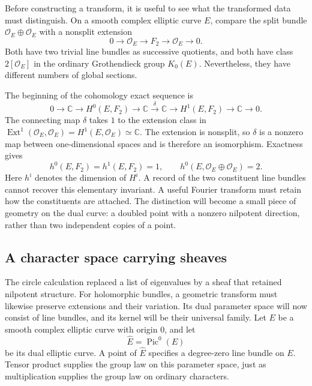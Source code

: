 \documentclass[11pt]{article}
\theoremstyle{remark}
\newcommand{\C}{\mathbb C}
\begin{document}
Before constructing a transform, it is useful to see what the transformed data must distinguish. On a smooth complex elliptic curve \(E\), compare the split bundle \(\mathcal O_E\oplus\mathcal O_E\) with a nonsplit extension
\begin{equation}
0\longrightarrow\mathcal O_E\longrightarrow F_2
\longrightarrow\mathcal O_E\longrightarrow0.
\label{categorical:f2}
\end{equation}
Both have two trivial line bundles as successive quotients, and both have class \(2[\mathcal O_E]\) in the ordinary Grothendieck group \(K_0(E)\). Nevertheless, they have different numbers of global sections.

The beginning of the cohomology exact sequence is
\[
0\longrightarrow\C\longrightarrow H^0(E,F_2)
\longrightarrow\C\xrightarrow{\ \delta\ }\C
\longrightarrow H^1(E,F_2)\longrightarrow\C\longrightarrow0.
\]
The connecting map \(\delta\) takes \(1\) to the extension class in
\(\operatorname{Ext}^1(\mathcal O_E,\mathcal O_E)=H^1(E,\mathcal O_E)\simeq\C\).
The extension is nonsplit, so \(\delta\) is a nonzero map between one-dimensional spaces and is therefore an isomorphism. Exactness gives
\begin{equation}
h^0(E,F_2)=h^1(E,F_2)=1,
\qquad
h^0(E,\mathcal O_E\oplus\mathcal O_E)=2.
\label{categorical:extension-sections}
\end{equation}
Here \(h^i\) denotes the dimension of \(H^i\). A record of the two constituent line bundles cannot recover this elementary invariant. A useful Fourier transform must retain how the constituents are attached. The distinction will become a small piece of geometry on the dual curve: a doubled point with a nonzero nilpotent direction, rather than two independent copies of a point.

\subsection{A character space carrying sheaves}

The circle calculation replaced a list of eigenvalues by a sheaf that retained nilpotent structure. For holomorphic bundles, a geometric transform must likewise preserve extensions and their variation. Its dual parameter space will now consist of line bundles, and its kernel will be their universal family. Let \(E\) be a smooth complex elliptic curve with origin \(0\), and let
\[
\widehat E=\operatorname{Pic}^0(E)
\]
be its dual elliptic curve. A point of \(\widehat E\) specifies a degree-zero line bundle on \(E\). Tensor product supplies the group law on this parameter space, just as multiplication supplies the group law on ordinary characters.
\end{document}
